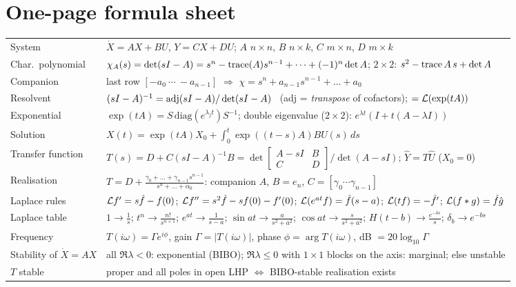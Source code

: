 \section{One-page formula sheet}
\begin{center}
\renewcommand{\arraystretch}{1.5}
\small
\begin{tabular}{@{}p{4.3cm}p{11cm}@{}}
\toprule
System & $\dot X=AX+BU$, $Y=CX+DU$; $A$ $n\times n$, $B$ $n\times k$, $C$ $m\times n$, $D$ $m\times k$\\
Char.\ polynomial & $\chi_A(s)=\det(sI-A)=s^n-\operatorname{trace}(A)s^{n-1}+\dots+(-1)^n\det A$; $2\times2$: $s^2-\operatorname{trace} A\,s+\det A$\\
Companion & last row $[-a_0\ \cdots\ -a_{n-1}]$ $\Rightarrow$ $\chi=s^n+a_{n-1}s^{n-1}+\dots+a_0$\\
Resolvent & $(sI-A)^{-1}=\operatorname{adj}(sI-A)/\det(sI-A)$ \ (adj = \emph{transpose} of cofactors); $=\mathcal{L}(\exp(tA))$\\
Exponential & $\exp(tA)=S\,\mathrm{diag}(e^{\lambda_jt})S^{-1}$; double eigenvalue ($2\times2$): $e^{\lambda t}(I+t(A-\lambda I))$\\
Solution & $X(t)=\exp(tA)X_0+\int_0^t\exp((t-s)A)BU(s)\,ds$\\
Transfer function & $T(s)=D+C(sI-A)^{-1}B=\det\begin{bmatrix}A-sI&B\\C&D\end{bmatrix}\big/\det(A-sI)$; $\hat Y=T\hat U$ ($X_0=0$)\\
Realisation & $T=D+\frac{\gamma_0+\dots+\gamma_{n-1}s^{n-1}}{s^n+\dots+\alpha_0}$: companion $A$, $B=e_n$, $C=[\gamma_0\cdots\gamma_{n-1}]$\\
Laplace rules & $\mathcal{L} f'=s\hat f-f(0)$; $\mathcal{L} f''=s^2\hat f-sf(0)-f'(0)$; $\mathcal{L}(e^{at}f)=\hat f(s-a)$; $\mathcal{L}(tf)=-\hat f'$; $\mathcal{L}(f*g)=\hat f\hat g$\\
Laplace table & $1\to\frac1s$; $t^n\to\frac{n!}{s^{n+1}}$; $e^{at}\to\frac1{s-a}$; $\sin at\to\frac a{s^2+a^2}$; $\cos at\to\frac s{s^2+a^2}$; $H(t-b)\to\frac{e^{-bs}}s$; $\delta_b\to e^{-bs}$\\
Frequency & $T(i\omega)=\Gamma e^{i\phi}$, gain $\Gamma=|T(i\omega)|$, phase $\phi=\arg T(i\omega)$, dB $=20\log_{10}\Gamma$\\
Stability of $\dot X=AX$ & all $\Re\lambda<0$: exponential (BIBO); $\Re\lambda\le0$ with $1\times1$ blocks on the axis: marginal; else unstable\\
$T$ stable & proper and all poles in open LHP $\iff$ BIBO-stable realisation exists\\

\end{tabular}
\end{center}
